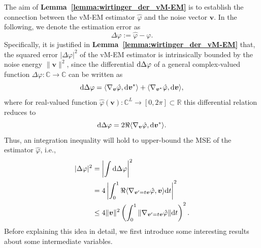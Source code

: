 \documentclass[journal,twocolumn]{IEEEtran}
\theoremstyle{nonumberplain}
\begin{document}
{The aim of {\bf Lemma~\ref{lemma:wirtinger_der_vM-EM}} is to establish the connection between the vM-EM estimator $\hat{\varphi}$ and the noise vector ${\bm v}$. In the following, we denote the estimation error as 
\begin{equation}
    \Delta\varphi := \hat{\varphi} - \varphi. 
\end{equation}
Specifically, it is justified in {\bf Lemma~\ref{lemma:wirtinger_der_vM-EM}} that, the squared error $|\Delta\varphi|^2$ of the vM-EM estimator is intrinsically bounded by the noise energy $\|{\bm v}\|^2$, since the differential ${\rm d}\Delta\varphi$ of a general complex-valued function $\Delta\varphi: \mathbb{C}\to\mathbb{C}$ can be written as 
\begin{equation}
    {\rm d}\Delta\varphi = \langle \nabla_{\bm v}\hat{\varphi}, {\rm d}{\bm v}^*\rangle + \langle \nabla_{{\bm v}^*}\hat{\varphi}, {\rm d}{\bm v}\rangle, 
\end{equation}
where for real-valued function $\hat{\varphi}({\bm v}): \mathbb{C}^L \to [0,2\pi]\subset \mathbb{R}$ this differential relation reduces to 
\begin{equation}
    {\rm d}\Delta\varphi = 2\Re\langle\nabla_{\bm v}\hat{\varphi}, {\rm d}{\bm v}^*\rangle. 
    \label{eqn:differential_of_error}
\end{equation}
Thus, an integration inequality will hold to upper-bound the MSE of the estimator $\hat{\varphi}$, i.e., 
\begin{equation}
    \begin{aligned}
        |\Delta{\varphi}|^2 &= \left| \int {\rm d}\Delta\varphi \right|^2 \\
        &= 4 \left| \int_{0}^{1} \Re\langle\nabla_{{\bm v}'=t {\bm v}}\hat{\varphi}, {\bm v}\rangle{\rm d}t \right|^2 \\
        &\leq 4\|{\bm v}\|^2 \left(\int_{0}^{1} \|\nabla_{{\bm v}'=t{\bm v}}\hat{\varphi} \| {\rm d} t \right)^2. 
    \end{aligned}
    \label{ineq:gradient_bound}
\end{equation}
Before explaining this idea in detail, we first introduce some interesting results about some intermediate variables.

}
\end{document}
